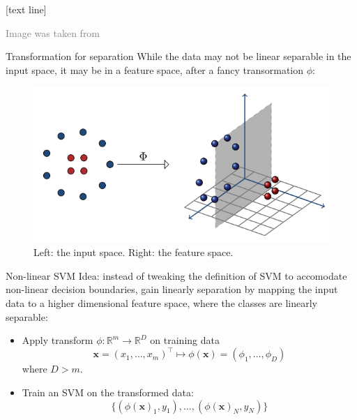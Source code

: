 \documentclass[dvipsnames]{beamer}
\newcommand{\referencefootnote}[1]{\setbeamertemplate{footline}[text line]{%
\parbox{0.9\paperwidth}{\vspace*{-23pt}\tiny{\textcolor{gray}{#1}}\hfill\scriptsize\insertframenumber}}}
\begin{document}
			{ \referencefootnote{Image was taken from \cite{mohri_fom}}
			\begin{frame}{Transformation for separation}
				While the data may not be linear separable in the input space, it may be in a feature space, after a fancy transormation $\phi$:
				\begin{figure}
					\center
					\includegraphics[scale=.5]{figures/nonlinear5.png}
					\caption{Left: the input space. Right: the feature space.}
        \end{figure}
			\end{frame}
			}
				
			\begin{frame}{Non-linear SVM}
				Idea: instead of tweaking the definition of SVM to accomodate non-linear decision boundaries, gain linearly separation by mapping the input data to a higher dimensional feature space, where the classes are linearly separable: %
				\begin{itemize}
					\item Apply transform $\phi:\mathbb{R}^m\rightarrow \mathbb{R}^{D}$ on training data
					\[
					\mathbf{x} = (x_1,\dots,x_m)^{\top} \mapsto \phi(\mathbf{x}) = (\phi_1,\dots,\phi_{D})
					\]
					where $D > m$. %
					\item Train an SVM on the transformed data:
					\[
						\{(\phi(\textbf{x})_1,y_1), \dots, (\phi(\textbf{x})_N,y_N)\}
					\]					
				\end{itemize}
			\end{frame}
			
\end{document}
